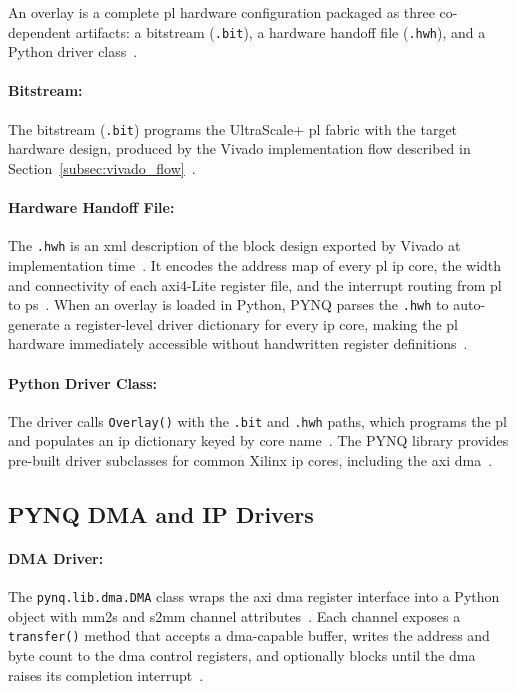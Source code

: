 An overlay is a complete \ac{pl} hardware configuration packaged as
three co-dependent artifacts: a bitstream (\texttt{.bit}), a hardware
handoff file (\texttt{.hwh}), and a Python driver class~\cite{PYNQ_DOC}.

\paragraph{Bitstream:}
The bitstream (\texttt{.bit}) programs the UltraScale+ \ac{pl} fabric
with the target hardware design, produced by the Vivado implementation
flow described in Section~\ref{subsec:vivado_flow}~\cite{PYNQ_DOC}.

\paragraph{Hardware Handoff File:}
The \texttt{.hwh} is an \ac{xml} description of the block design
exported by Vivado at implementation time~\cite{PYNQ_DOC}.
It encodes the address map of every \ac{pl} \ac{ip} core, the width
and connectivity of each \ac{axi}4-Lite register file, and the
interrupt routing from \ac{pl} to \ac{ps}~\cite{PYNQ_DOC}.
When an overlay is loaded in Python, PYNQ parses the \texttt{.hwh}
to auto-generate a register-level driver dictionary for every \ac{ip}
core, making the \ac{pl} hardware immediately accessible without
handwritten register definitions~\cite{PYNQ_DOC}.

\paragraph{Python Driver Class:}
The driver calls \texttt{Overlay()} with the \texttt{.bit} and
\texttt{.hwh} paths, which programs the \ac{pl} and populates an
\ac{ip} dictionary keyed by core name~\cite{PYNQ_DOC}.
The PYNQ library provides pre-built driver subclasses for common
Xilinx \ac{ip} cores, including the \ac{axi} \ac{dma}~\cite{PYNQ_DOC}.


\subsection{PYNQ DMA and IP Drivers}
\label{subsec:pynq_drivers}

\paragraph{DMA Driver:}
The \texttt{pynq.lib.dma.DMA} class wraps the \ac{axi} \ac{dma}
register interface into a Python object with \ac{mm2s} and \ac{s2mm}
channel attributes~\cite{PYNQ_DOC}.
Each channel exposes a \texttt{transfer()} method that accepts a
\ac{dma}-capable buffer, writes the address and byte count to the
\ac{dma} control registers, and optionally blocks until the \ac{dma}
raises its completion interrupt~\cite{PYNQ_DOC}.

